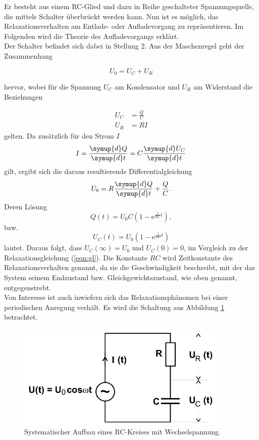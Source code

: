 Er besteht aus einem RC-Glied und dazu in Reihe geschalteter Spannungsquelle, die mittels Schalter überbrückt werden kann.
Nun ist es möglich, das Relaxationsverhalten am Entlade- oder Aufladevorgang zu repräsentieren.
Im Folgenden wird die Theorie des Aufladevorgangs erklärt.\\
Der Schalter befindet sich dabei in Stellung 2.
Aus der Maschenregel geht der Zusammenhang

\begin{equation}
  U_0 = U_C + U_R \label{eqn:1}
\end{equation}

hervor, wobei für die Spannung $U_C$ am Kondensator und $U_R$ am Widerstand die Beziehungen

\begin{align*}
  U_C &= \frac{Q}{C}\\
  U_R &= RI
\end{align*}
gelten.
Da zusätzlich für den Strom $I$
\begin{equation}
  I = \frac{\symup{d} Q}{\symup{d} t} = C\frac{\symup{d} U_C}{\symup{d} t} \label{eqn:2}
\end{equation}
gilt, ergibt sich die daraus resultierende Differentialgleichung
\begin{equation}
  U_0 = R\frac{\symup{d} Q}{\symup{d} t} + \frac{Q}{C}.
\end{equation}
Deren Lösung
\begin{equation}
  Q(t) = U_0C(1-\mathrm{e}^{\frac{1}{RC}t}),
\end{equation}
bzw.
\begin{equation}
  U_C(t) = U_0(1-\mathrm{e}^{\frac{1}{RC}t}) \label{eqn:gl2}
\end{equation}
lautet.
Daraus folgt, dass $U_C(\infty) = U_0$ und $U_C(0) = 0$, im Vergleich zu der Relaxationsgleichung (\ref{eqn:gl}).
Die Konstante $RC$ wird Zeitkonstante des Relaxationsverhalten genannt, da sie die Geschwindigkeit beschreibt, mit der das System seinem Endzustand bzw. Gleichgewichtszustand, wie oben genannt, entgegenstrebt.\\
Von Interesse ist auch inwiefern sich das Relaxationsphänomen bei einer periodischen Anregung verhält.
Es wird die Schaltung aus Abbildung \ref{fig:2} betrachtet.

\begin{figure}[H]
  \centering
  \includegraphics[height=5cm]{kreis2.png}
  \caption{Systematischer Aufbau eines RC-Kreises mit Wechselspannung. \cite{sample}}
  \label{fig:2}
\end{figure}

